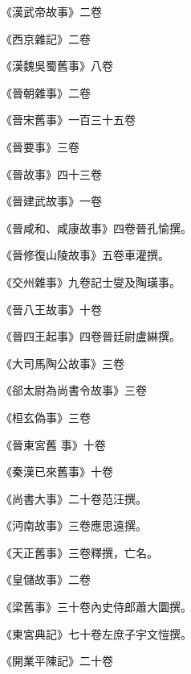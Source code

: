 \begin{pinyinscope}
 《漢武帝故事》二卷



 《西京雜記》二卷



 《漢魏吳蜀舊事》八卷



 《晉朝雜事》二卷



 《晉宋舊事》一百三十五卷



 《晉要事》三卷



 《晉故事》四十三卷



 《晉建武故事》一卷



 《晉咸和、咸康故事》四卷晉孔愉撰。



 《晉修復山陵故事》五卷車灌撰。



 《交州雜事》九卷記士燮及陶璜事。



 《晉八王故事》十卷



 《晉四王起事》四卷晉廷尉盧綝撰。



 《大司馬陶公故事》三卷



 《郤太尉為尚書令故事》三卷



 《桓玄偽事》三卷



 《晉東宮舊
 事》十卷



 《秦漢已來舊事》十卷



 《尚書大事》二十卷范汪撰。



 《沔南故事》三卷應思遠撰。



 《天正舊事》三卷釋撰，亡名。



 《皇儲故事》二卷



 《梁舊事》三十卷內史侍郎蕭大圜撰。



 《東宮典記》七十卷左庶子宇文愷撰。



 《開業平陳記》二十卷




\end{pinyinscope}
